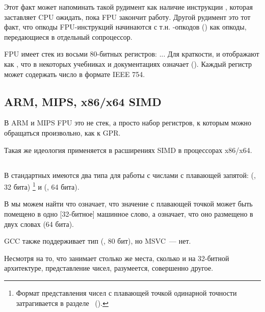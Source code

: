 Этот факт может напоминать такой рудимент как наличие инструкции , которая заставляет
\ac{CPU} ожидать, пока \ac{FPU} закончит работу.
Другой рудимент это тот факт, что опкоды \ac{FPU}-инструкций начинаются с т.н. -опкодов 
() как опкоды, передающиеся в отдельный сопроцессор.

\label{FPU_is_stack}
FPU имеет стек из восьми 80-битных регистров: ...
Для краткости, \IDA и \olly отображают  как ,
что в некоторых учебниках и документациях означает  ().
Каждый регистр может содержать число в формате IEEE 754\FNURLIEEE.

\subsection{ARM, MIPS, x86/x64 SIMD}

В ARM и MIPS FPU это не стек, а просто набор регистров, к которым можно обращаться произвольно, как к \ac{GPR}.

Такая же идеология применяется в расширениях SIMD в процессорах x86/x64.

\subsection{\CCpp}

В стандартных \CCpp имеются два типа для работы с числами с плавающей запятой: 
\Tfloat (\FNURLSP, 32 бита)
\footnote{Формат представления чисел с плавающей точкой одинарной точности затрагивается в разделе 
\IT{\WorkingWithFloatAsWithStructSubSubSectionName}~().}
и \Tdouble (\FNURLDP, 64 бита).

В  мы можем найти что  означает, что значение с плавающей точкой может быть
помещено в одно [32-битное] машинное слово, а  означает, что оно размещено в двух словах (64 бита).

GCC также поддерживает тип  (\FNURLEP, 80 бит), но MSVC~--- нет.

Несмотря на то, что \Tfloat занимает столько же места, сколько и \Tint на 32-битной архитектуре, 
представление чисел, разумеется, совершенно другое.





